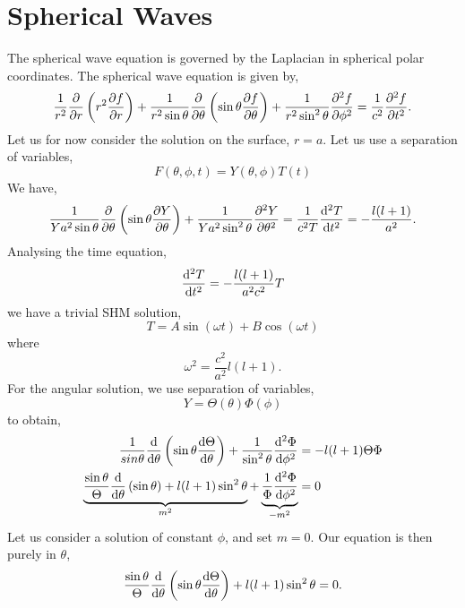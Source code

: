 \documentclass{book}
\begin{document}
\section{Spherical Waves}
The spherical wave equation is governed by the Laplacian in spherical polar coordinates. The spherical wave equation is given by,
\begin{equation}
	\frac{1}{r^2}\pdv{r}\left(r^2\pdv{f}{r}\right) + \frac{1}{r^2\sin\theta}\pdv{\theta}\left(\sin\theta \pdv{f}{\theta}\right) + \frac{1}{r^2\sin^2\theta}\pdv[2]{f}{\phi} = \frac{1}{c^2} \pdv[2]{f}{t}.
\end{equation}
Let us for now consider the solution on the surface, $r = a$. Let us use a separation of variables, 
\begin{equation}
	F(\theta, \phi, t) = Y(\theta, \phi)T(t)
\end{equation}
We have,
\begin{equation}
	\frac{1}{Ya^2\sin\theta}\pdv{\theta}\left(\sin\theta \pdv{Y}{\theta}\right) + \frac{1}{Y a^2\sin^2\theta}\pdv[2]{Y}{\theta} = \frac{1}{c^2T}\dv[2]{T}{t} = -\frac{l(l+1)}{a^2}.
\end{equation}
Analysing the time equation,
\begin{equation}
	\dv[2]{T}{t} = - \frac{l(l+1)}{a^2c^2}T
\end{equation}
we have a trivial SHM solution,
\begin{equation}
	T = A\sin(\omega t) + B\cos(\omega t)
\end{equation}
where
\begin{equation}
	\omega^2 = \frac{c^2}{a^2}l(l+1).
\end{equation}
For the angular solution, we use separation of variables,
\begin{equation}
	Y = \Theta(\theta)\Phi(\phi)
\end{equation}
to obtain,
\begin{equation}
	\begin{split}
	\frac{1}{sin\theta}\dv{\theta}\left(\sin\theta\dv{\Theta}{\theta}\right) + \frac{1}{\sin^2\theta}\dv[2]{\Phi}{\phi} & = -l(l+1)\Theta\Phi \\
	\underbrace{\frac{\sin\theta}{\Theta}\dv{\theta}\left(\sin\theta\right) + l(l+1)\sin^2\theta}_{m^2} + \underbrace{\frac{1}{\Phi}\dv[2]{\Phi}{\phi}}_{-m^2} & = 0 
	\end{split}
\end{equation}
Let us consider a solution of constant $\phi$, and set $m=0$. Our equation is then purely in $\theta$,
\begin{equation}
	\frac{\sin\theta}{\Theta}\dv{\theta}\left(\sin\theta \dv{\Theta}{\theta}\right) + l(l+1)\sin^2\theta = 0.
\end{equation}
\end{document}
